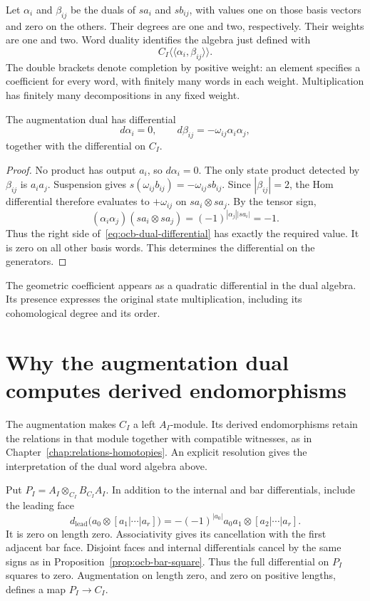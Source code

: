 Let $\alpha_i$ and $\beta_{ij}$ be the duals of $sa_i$ and
$sb_{ij}$, with values one on those basis vectors and zero on the
others. Their degrees are one and two, respectively.
Their weights are one and two.
Word duality identifies the algebra just defined with
\[
 C_I\langle\!\langle\alpha_i,\beta_{ij}\rangle\!\rangle.
\]
The double brackets denote completion by positive weight:
an element specifies a coefficient for every word, with finitely
many words in each weight. Multiplication has finitely many
decompositions in any fixed weight.

\begin{proposition}\label{prop:ocb-dual-differential}
The augmentation dual has differential
\begin{equation}\label{eq:ocb-dual-differential}
 d\alpha_i=0,\qquad
 d\beta_{ij}=-\omega_{ij}\alpha_i\alpha_j,
\end{equation}
together with the differential on $C_I$.
\end{proposition}

\begin{proof}
No product has output $a_i$, so $d\alpha_i=0$.
The only state product detected by $\beta_{ij}$ is $a_i a_j$.
Suspension gives
$s(\omega_{ij}b_{ij})=-\omega_{ij}sb_{ij}$.
Since $|\beta_{ij}|=2$, the Hom differential therefore evaluates
to $+\omega_{ij}$ on $sa_i\otimes sa_j$.
By the tensor sign,
\[
 (\alpha_i\alpha_j)(sa_i\otimes sa_j)
 =(-1)^{|\alpha_j||sa_i|}=-1.
\]
Thus the right side of~\eqref{eq:ocb-dual-differential} has exactly
the required value. It is zero on all other basis words.
This determines the differential on the generators.
\end{proof}

The geometric coefficient appears as a quadratic differential in
the dual algebra. Its presence expresses the original state
multiplication, including its cohomological degree and its order.

\section{Why the augmentation dual computes derived endomorphisms}

The augmentation makes $C_I$ a left $A_I$-module.
Its derived endomorphisms retain the relations in that module
together with compatible witnesses, as in
Chapter~\ref{chap:relations-homotopies}.
An explicit resolution gives the interpretation of the dual word
algebra above.

Put $P_I=A_I\otimes_{C_I}B_{C_I}A_I$.
In addition to the internal and bar differentials, include the
leading face
\[
 d_{\mathrm{lead}}\bigl(a_0\otimes[a_1|\cdots|a_r]\bigr)
 =-(-1)^{|a_0|}a_0a_1\otimes[a_2|\cdots|a_r].
\]
It is zero on length zero.
Associativity gives its cancellation with the first adjacent bar
face. Disjoint faces and internal differentials cancel by the
same signs as in Proposition~\ref{prop:ocb-bar-square}.
Thus the full differential on $P_I$ squares to zero.
Augmentation on length zero, and zero on positive lengths,
defines a map $P_I\to C_I$.

